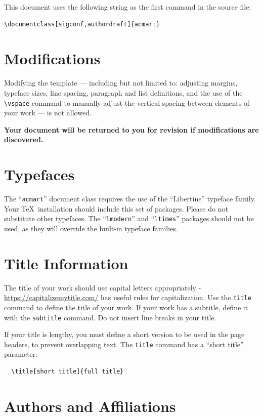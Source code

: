 \documentclass[manuscript,screen,review]{acmart}
\begin{document}
This document uses the following string as the first command in the
source file:
\begin{verbatim}
\documentclass[sigconf,authordraft]{acmart}
\end{verbatim}

\section{Modifications}

Modifying the template --- including but not limited to: adjusting
margins, typeface sizes, line spacing, paragraph and list definitions,
and the use of the \verb|\vspace| command to manually adjust the
vertical spacing between elements of your work --- is not allowed.

{\bfseries Your document will be returned to you for revision if
  modifications are discovered.}

\section{Typefaces}

The ``\verb|acmart|'' document class requires the use of the
``Libertine'' typeface family. Your \TeX\ installation should include
this set of packages. Please do not substitute other typefaces. The
``\verb|lmodern|'' and ``\verb|ltimes|'' packages should not be used,
as they will override the built-in typeface families.

\section{Title Information}

The title of your work should use capital letters appropriately -
\url{https://capitalizemytitle.com/} has useful rules for
capitalization. Use the {\verb|title|} command to define the title of
your work. If your work has a subtitle, define it with the
{\verb|subtitle|} command.  Do not insert line breaks in your title.

If your title is lengthy, you must define a short version to be used
in the page headers, to prevent overlapping text. The \verb|title|
command has a ``short title'' parameter:
\begin{verbatim}
  \title[short title]{full title}
\end{verbatim}

\section{Authors and Affiliations}
\end{document}
